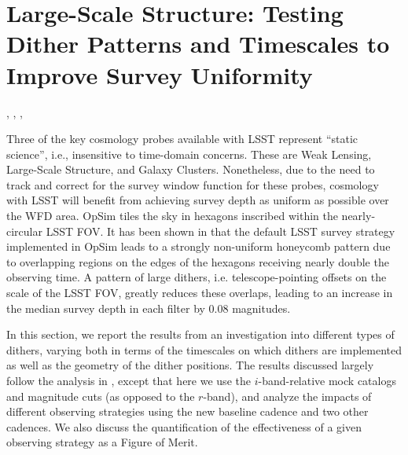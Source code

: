 %
%
%
\newcommand{\sigmaOS}[0]{$\sigma_{\mathrm{C_{\ell, {OS}}}}$}
\newcommand{\CellOS}[0]{$C_{\ell, \rm{OS}}$}
\newcommand{\statFloor}[0]{$\Delta C_\ell$}
\newcommand{\delobs}[0]{\delta_{\mathrm{obs},i}}
\newcommand{\dellss}[0]{\delta_{\mathrm{LSS},i}}
\newcommand{\delos}[0]{\delta_{\mathrm{OS},i}}
\newcommand{\ev}[1]{\left < {#1} \right >}

\section{Large-Scale Structure: Testing Dither Patterns and Timescales to Improve Survey Uniformity}
\def\secname{lss}\label{sec:\secname}

,
,
,

Three of the key cosmology probes available with LSST represent ``static science'', i.e., insensitive to time-domain concerns.  These are Weak Lensing, Large-Scale Structure, and Galaxy Clusters.  Nonetheless, due to the need to track and correct for the survey window function for these probes, cosmology with LSST will benefit from achieving survey depth as uniform as possible over the WFD area.  OpSim tiles the sky in hexagons inscribed within the nearly-circular LSST FOV. It has been shown in \citet{CarrollEtal2014} that the default LSST survey strategy implemented in OpSim leads to a strongly non-uniform honeycomb pattern due to overlapping regions on the edges of the hexagons receiving nearly double the observing time.  A pattern of large dithers, i.e. telescope-pointing offsets on the scale of the LSST FOV, greatly reduces these overlaps, leading to an increase in the median survey depth in each filter by 0.08 magnitudes.

In this section, we report the results from an investigation into different types of dithers, varying both in terms of the timescales on which dithers are implemented as well as the geometry of the dither positions. The results discussed largely follow the analysis in \citet{AwanEtal2016}, except that here we use the $i$-band-relative mock catalogs and magnitude cuts (as opposed to the $r$-band), and analyze the impacts of different observing strategies using the new baseline cadence  and two other cadences. We also discuss the quantification of the effectiveness of a given observing strategy as a Figure of Merit.

